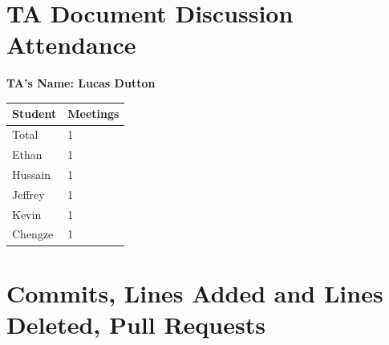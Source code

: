\documentclass{article}
\begin{document}

\section{TA Document Discussion Attendance}




\noindent \textbf{TA's Name: Lucas Dutton }

\begin{table}[H]
\centering
\begin{tabular}{ll}
\toprule
\textbf{Student} & \textbf{Meetings}\\
\midrule
Total & 1\\
Ethan & 1\\
Hussain & 1\\
Jeffrey & 1\\
Kevin & 1\\
Chengze & 1\\
\bottomrule
\end{tabular}
\end{table}



\section{Commits, Lines Added and Lines Deleted, Pull Requests}


\end{document}
